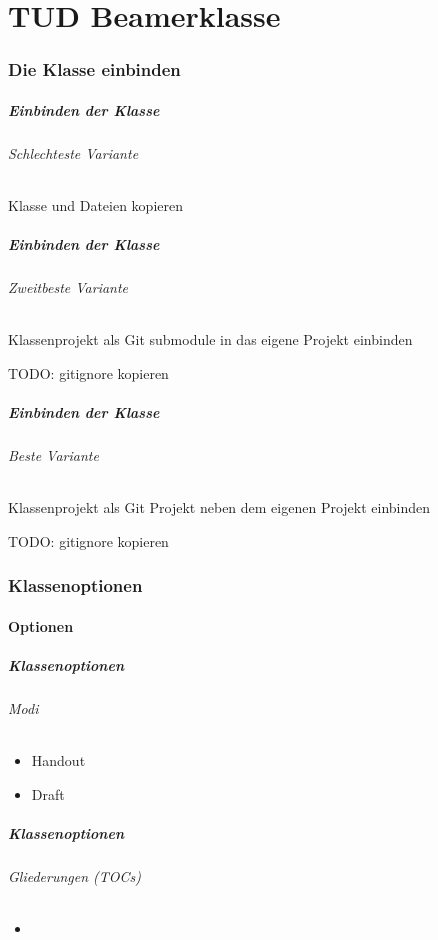 \documentclass[german,aspectratio=169,notoc,titlestyle=tud,draft]{tudbeamer}%
\begin{document}
\part{TUD Beamerklasse}
\section{Die Klasse einbinden}
\begin{frame}
	\frametitle{Einbinden der Klasse}
	\framesubtitle{Schlechteste Variante}

	Klasse und Dateien kopieren
\end{frame}
\begin{frame}
	\frametitle{Einbinden der Klasse}
	\framesubtitle{Zweitbeste Variante}

	Klassenprojekt als Git submodule in das eigene Projekt einbinden

	TODO: gitignore kopieren
\end{frame}
\begin{frame}
	\frametitle{Einbinden der Klasse}
	\framesubtitle{Beste Variante}

	Klassenprojekt als Git Projekt neben dem eigenen Projekt einbinden

	TODO: gitignore kopieren
\end{frame}

\section{Klassenoptionen}
\subsection{Optionen}
\begin{frame}
	\frametitle{Klassenoptionen}
	\framesubtitle{Modi}

	\begin{itemize}
		\item Handout
		\item Draft
	\end{itemize}

\end{frame}

\begin{frame}
	\frametitle{Klassenoptionen}
	\framesubtitle{Gliederungen (TOCs)}

	\begin{itemize}
		\item 
	\end{itemize}

\end{frame}
\end{document}
